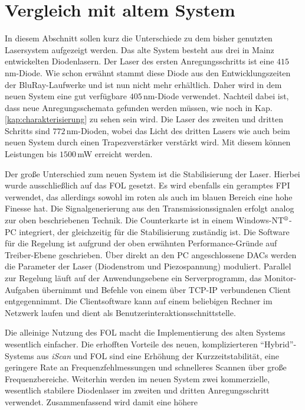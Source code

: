 \section{Vergleich mit altem System}\label{sec:vergleich_mit_altem_system}
In diesem Abschnitt sollen kurz die Unterschiede zu dem bisher genutzten
Lasersystem aufgezeigt werden. Das alte System besteht aus drei in Mainz
entwickelten Diodenlasern. Der Laser des ersten Anregungsschritts ist eine
$415\,$nm-Diode. Wie schon erwähnt stammt diese Diode aus den Entwicklungszeiten
der BluRay-Laufwerke und ist nun nicht mehr erhältlich. Daher wird in dem neuen
System eine gut verfügbare $405\,$nm-Diode verwendet. Nachteil dabei ist, dass
neue Anregungsschemata gefunden werden müssen, wie noch in Kap.
\ref{kap:charakterisierung} zu sehen sein wird. Die Laser des zweiten und
dritten Schritts sind $772\,$nm-Dioden, wobei das Licht des dritten Lasers wie
auch beim neuen System durch einen Trapezverstärker verstärkt wird. Mit diesem
können Leistungen bis $1500\,$mW erreicht werden.\par
Der große Unterschied zum neuen System ist die Stabilisierung der Laser. Hierbei
wurde ausschließlich auf das FOL gesetzt. Es wird ebenfalls
ein geramptes FPI verwendet, das allerdings sowohl im roten als auch im blauen
Bereich eine hohe Finesse hat. Die Signalgenerierung aus den
Transmissionssignalen erfolgt analog zur oben beschriebenen Technik. Die
Counterkarte ist in einem Windows-NT$^\text{\textregistered}$-PC integriert, der
gleichzeitig für die Stabilisierung zuständig ist. Die Software für die Regelung
ist aufgrund der oben erwähnten Performance-Gründe auf Treiber-Ebene
geschrieben. Über direkt an den PC angeschlossene DACs werden die Parameter der
Laser (Diodenstrom und Piezospannung) moduliert. Parallel zur Regelung läuft auf
der Anwendungsebene ein Serverprogramm, das Monitor-Aufgaben übernimmt und
Befehle von einem über TCP-IP verbundenen Client entgegennimmt. Die
Clientsoftware kann auf einem beliebigen Rechner im Netzwerk laufen und dient
als Benutzerinteraktionsschnittstelle.\par
Die alleinige Nutzung des FOL macht die Implementierung des
alten Systems wesentlich einfacher. Die erhofften Vorteile des neuen,
komplizierteren "`Hybrid"'-Systems aus \textit{iScan} und FOL
sind eine Erhöhung der Kurzzeitstabilität, eine geringere Rate an Frequenzfehlmessungen
und schnelleres Scannen über große Frequenzbereiche. Weiterhin werden im neuen
System zwei kommerzielle, wesentlich stabilere Diodenlaser im zweiten und
dritten Anregungsschritt verwendet. Zusammenfassend wird damit eine höhere
